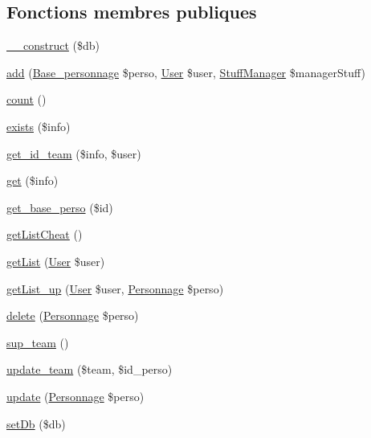 \subsection*{Fonctions membres publiques}
\begin{DoxyCompactItemize}
\item 
\mbox{\hyperlink{class_personnages_manager_a7d278f81159b0faf52c83338147f4e40}{\+\_\+\+\_\+construct}} (\$db)
\item 
\mbox{\hyperlink{class_personnages_manager_a3ce7c5751a3faedb4f639a009ff0243e}{add}} (\mbox{\hyperlink{class_base__personnage}{Base\+\_\+personnage}} \$perso, \mbox{\hyperlink{class_user}{User}} \$user, \mbox{\hyperlink{class_stuff_manager}{Stuff\+Manager}} \$manager\+Stuff)
\item 
\mbox{\hyperlink{class_personnages_manager_a8f6dfe7defa71cebda7abe39c6aecf83}{count}} ()
\item 
\mbox{\hyperlink{class_personnages_manager_ac6a8e85041681ee0e6c32ade99529273}{exists}} (\$info)
\item 
\mbox{\hyperlink{class_personnages_manager_a31cfc4ec0c66e7c885aabd6cd021bc39}{get\+\_\+id\+\_\+team}} (\$info, \$user)
\item 
\mbox{\hyperlink{class_personnages_manager_af1c8198c1c5179b5d1f86fd56e7187e2}{get}} (\$info)
\item 
\mbox{\hyperlink{class_personnages_manager_abe85df761fe398c2d711bdcdb4375a5a}{get\+\_\+base\+\_\+perso}} (\$id)
\item 
\mbox{\hyperlink{class_personnages_manager_ac8ff12b20aab3b59b50efaeb851d8845}{get\+List\+Cheat}} ()
\item 
\mbox{\hyperlink{class_personnages_manager_add99175d706a1b0909c8c8857561ea41}{get\+List}} (\mbox{\hyperlink{class_user}{User}} \$user)
\item 
\mbox{\hyperlink{class_personnages_manager_a3453160024d09fb70cb0a16e4de14ffe}{get\+List\+\_\+up}} (\mbox{\hyperlink{class_user}{User}} \$user, \mbox{\hyperlink{class_personnage}{Personnage}} \$perso)
\item 
\mbox{\hyperlink{class_personnages_manager_a2c8f754617cbf40ff851a1c91fb7ea9b}{delete}} (\mbox{\hyperlink{class_personnage}{Personnage}} \$perso)
\item 
\mbox{\hyperlink{class_personnages_manager_abae7db357c0730386a2804f1716d26f2}{sup\+\_\+team}} ()
\item 
\mbox{\hyperlink{class_personnages_manager_a1847a27412e7325761f5866f584e3b22}{update\+\_\+team}} (\$team, \$id\+\_\+perso)
\item 
\mbox{\hyperlink{class_personnages_manager_a21d75e552a085ee6178544d71f72b31c}{update}} (\mbox{\hyperlink{class_personnage}{Personnage}} \$perso)
\item 
\mbox{\hyperlink{class_personnages_manager_ad34d7d8f0716d1261437eff3eb7af7d0}{set\+Db}} (\$db)
\end{DoxyCompactItemize}


